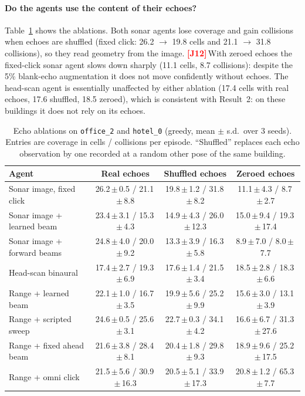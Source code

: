 \documentclass[10pt]{article}
\newif\ifreview \ifdefined\REVIEWMODE \reviewtrue \fi
\newcommand{\J}[1]{\ifreview\textcolor{red}{\textbf{[J#1]}}\,\fi}   %
\newcommand{\pmsd}[2]{#1\,{\scriptsize$\pm$\,#2}}
\begin{document}
\paragraph{Do the agents use the content of their echoes?} Table~\ref{tab:ablation} shows the ablations. Both sonar agents lose coverage and gain collisions when echoes are shuffled (fixed click: 26.2 $\to$ 19.8 cells and 21.1 $\to$ 31.8 collisions), so they read geometry from the image. \J{12}With zeroed echoes the fixed-click sonar agent slows down sharply (11.1 cells, 8.7 collisions): despite the 5\% blank-echo augmentation it does not move confidently without echoes. The head-scan agent is essentially unaffected by either ablation (17.4 cells with real echoes, 17.6 shuffled, 18.5 zeroed), which is consistent with Result~2: on these buildings it does not rely on its echoes.

\begin{table}[t]
\caption{Echo ablations on \texttt{office\_2} and \texttt{hotel\_0} (greedy, mean $\pm$ s.d.\ over 3 seeds). Entries are coverage in cells / collisions per episode. ``Shuffled'' replaces each echo observation by one recorded at a random other pose of the same building.}
\label{tab:ablation}
\centering\small
\begin{tabular}{lccc}
\toprule
Agent & Real echoes & Shuffled echoes & Zeroed echoes \\
\midrule
Sonar image, fixed click & \pmsd{26.2}{0.5} / \pmsd{21.1}{8.8} & \pmsd{19.8}{1.2} / \pmsd{31.8}{8.2} & \pmsd{11.1}{4.3} / \pmsd{8.7}{2.7} \\
Sonar image + learned beam & \pmsd{23.4}{3.1} / \pmsd{15.3}{4.3} & \pmsd{14.9}{4.3} / \pmsd{26.0}{12.3} & \pmsd{15.0}{9.4} / \pmsd{19.3}{17.4} \\
Sonar image + forward beams & \pmsd{24.8}{4.0} / \pmsd{20.0}{9.2} & \pmsd{13.3}{3.9} / \pmsd{16.3}{5.8} & \pmsd{8.9}{7.0} / \pmsd{8.0}{7.7} \\
Head-scan binaural & \pmsd{17.4}{2.7} / \pmsd{19.3}{6.9} & \pmsd{17.6}{1.4} / \pmsd{21.5}{3.4} & \pmsd{18.5}{2.8} / \pmsd{18.3}{6.6} \\
\addlinespace
Range + learned beam & \pmsd{22.1}{1.0} / \pmsd{16.7}{3.5} & \pmsd{19.9}{5.6} / \pmsd{25.2}{9.9} & \pmsd{15.6}{3.0} / \pmsd{13.1}{3.9} \\
Range + scripted sweep & \pmsd{24.6}{0.5} / \pmsd{25.6}{3.1} & \pmsd{22.7}{0.3} / \pmsd{34.1}{4.2} & \pmsd{16.6}{6.7} / \pmsd{31.3}{27.6} \\
Range + fixed ahead beam & \pmsd{21.6}{3.8} / \pmsd{28.4}{8.1} & \pmsd{20.4}{1.8} / \pmsd{29.8}{9.3} & \pmsd{18.9}{9.6} / \pmsd{25.2}{17.5} \\
Range + omni click & \pmsd{21.5}{5.6} / \pmsd{30.9}{16.3} & \pmsd{20.5}{5.1} / \pmsd{33.9}{17.3} & \pmsd{20.8}{1.2} / \pmsd{65.3}{7.7} \\
\bottomrule
\end{tabular}
\end{table}
\end{document}
